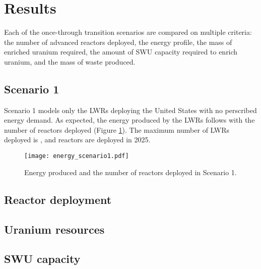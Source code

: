 \section{Results}
Each of the once-through transition scenarios are compared on multiple 
criteria: the number of advanced reactors deployed, the energy profile, 
the mass of enriched 
uranium required, the amount of \gls{SWU} capacity required to enrich uranium,
and the mass of waste produced. 

\subsection{Scenario 1}
Scenario 1 models only the \glspl{LWR} deploying the United States with no 
perscribed energy demand. As expected, the energy 
produced by the \glspl{LWR} follows with the number of reactors deployed
(Figure \ref{fig:energy1}). The maximum number of \glspl{LWR} deployed is 
, and reactors are deployed in 2025. 

\begin{figure}
    \centering
    \texttt{[image: energy\_scenario1.pdf]}
    \caption{Energy produced and the number of reactors deployed in Scenario 1.}
    \label{fig:energy1}
\end{figure}

\subsection{Reactor deployment}

\subsection{Uranium resources}

\subsection{SWU capacity}